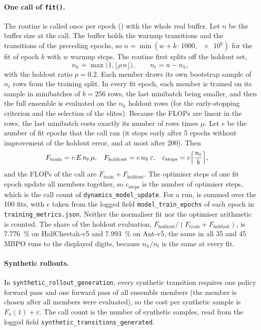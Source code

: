 \paragraph{One call of \texttt{fit()}.} The routine is called once per epoch () with the whole real buffer.
Let $n$ be the buffer size at the call.
The buffer holds the warmup transitions and the transitions of the preceding epochs, so $n=\min(w+k\cdot\num{1000},\,\num{e6})$ for the fit of epoch $k$ with $w$ warmup steps.
The routine first splits off the holdout set,
\begin{equation}
  n_h=\max\bigl(1,\lfloor \rho\,n\rfloor\bigr),\qquad n_t=n-n_h ,
  \label{eq:app-split}
\end{equation}
with the holdout ratio $\rho=0.2$.
Each member draws its own bootstrap sample of $n_t$ rows from the training split.
In every fit epoch, each member is trained on its sample in minibatches of $b=256$ rows, the last minibatch being smaller, and then the full ensemble is evaluated on the $n_h$ holdout rows (for the early-stopping criterion and the selection of the elites).
Because the FLOPs are linear in the rows, the last minibatch costs exactly its number of rows times $\mu$.
Let $e$ be the number of fit epochs that the call ran (it stops early after \num{5} epochs without improvement of the holdout error, and at most after \num{200}).
Then
\begin{align}
  F_{\mathrm{train}} &= e\,E\,n_t\,\mu , &
  F_{\mathrm{holdout}} &= e\,n_h\,\varepsilon , &
  c_{\mathrm{steps}} &= e\Bigl\lceil \frac{n_t}{b}\Bigr\rceil ,
  \label{eq:app-fit}
\end{align}
and the FLOPs of the call are $F_{\mathrm{train}}+F_{\mathrm{holdout}}$.
The optimiser steps of one fit epoch update all members together, so $c_{\mathrm{steps}}$ is the number of optimiser steps, which is the call count of \texttt{dynamics\_\allowbreak model\_\allowbreak update}.
For a run,  is summed over the \num{100} fits, with $e$ taken from the logged field \texttt{model\_\allowbreak train\_\allowbreak epochs} of each epoch in \texttt{training\_\allowbreak metrics.json}.
Neither the normaliser fit nor the optimiser arithmetic is counted.
The share of the holdout evaluation, $F_{\mathrm{holdout}}/(F_{\mathrm{train}}+F_{\mathrm{holdout}})$, is \SI{7.776}{\percent} on HalfCheetah-v5 and \SI{7.993}{\percent} on Ant-v5, the same in all \num{35} and \num{45} MBPO runs to the displayed digits, because $n_h/n_t$ is the same at every fit.

\paragraph{Synthetic rollouts.} In \texttt{synthetic\_\allowbreak rollout\_\allowbreak generation}, every synthetic transition requires one policy forward pass and one forward pass of all ensemble members (the member is chosen after all members were evaluated), so the cost per synthetic sample is $F_\pi(1)+\varepsilon$.
The call count is the number of synthetic samples, read from the logged field \texttt{synthetic\_\allowbreak transitions\_\allowbreak generated}.

